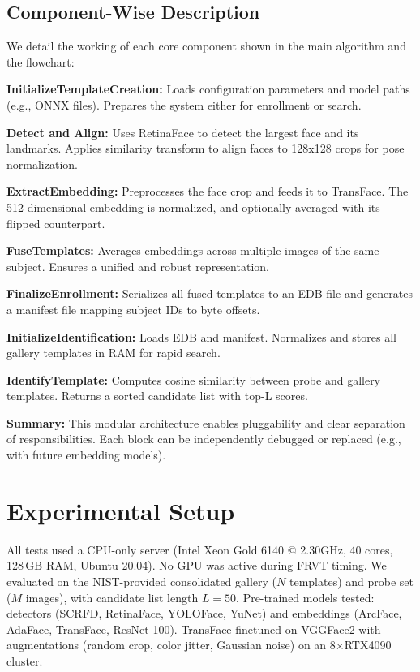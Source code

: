 \documentclass[conference]{IEEEtran}
\begin{document}
\subsection{Component-Wise Description}

We detail the working of each core component shown in the main algorithm and the flowchart:

\textbf{InitializeTemplateCreation:} Loads configuration parameters and model paths (e.g., ONNX files). Prepares the system either for enrollment or search.

\textbf{Detect and Align:} Uses RetinaFace to detect the largest face and its landmarks. Applies similarity transform to align faces to 128x128 crops for pose normalization.

\textbf{ExtractEmbedding:} Preprocesses the face crop and feeds it to TransFace. The 512-dimensional embedding is normalized, and optionally averaged with its flipped counterpart.

\textbf{FuseTemplates:} Averages embeddings across multiple images of the same subject. Ensures a unified and robust representation.

\textbf{FinalizeEnrollment:} Serializes all fused templates to an EDB file and generates a manifest file mapping subject IDs to byte offsets.

\textbf{InitializeIdentification:} Loads EDB and manifest. Normalizes and stores all gallery templates in RAM for rapid search.

\textbf{IdentifyTemplate:} Computes cosine similarity between probe and gallery templates. Returns a sorted candidate list with top-L scores.

\textbf{Summary:} This modular architecture enables pluggability and clear separation of responsibilities. Each block can be independently debugged or replaced (e.g., with future embedding models).


\section{Experimental Setup}
All tests used a CPU-only server (Intel Xeon Gold 6140 @ 2.30GHz, 40 cores, 128 GB RAM, Ubuntu 20.04). No GPU was active during FRVT timing. We evaluated on the NIST-provided consolidated gallery ($N$ templates) and probe set ($M$ images), with candidate list length $L=50$. Pre-trained models tested: detectors (SCRFD, RetinaFace, YOLOFace, YuNet) and embeddings (ArcFace, AdaFace, TransFace, ResNet-100). TransFace finetuned on VGGFace2 with augmentations (random crop, color jitter, Gaussian noise) on an 8×RTX4090 cluster.
\end{document}
